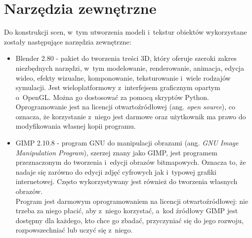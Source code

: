 \documentclass[a4paper,twoside,12pt]{book}
\newcommand{\obcy}[1]{\emph{#1}}
\newcommand{\ang}[1]{{\selectlanguage{british}\obcy{#1}}}
\begin{document}
\section{Narzędzia zewnętrzne}
Do konstrukcji scen, w~tym utworzenia modeli i~tekstur obiektów wykorzystane zostały następujące narzędzia zewnętrzne:
\begin{itemize}
    \item Blender 2.80 - pakiet do tworzenia treści 3D, który oferuje szeroki zakres niezbędnych narzędzi, w~tym modelowanie, renderowanie, animacja, edycja wideo, efekty wizualne, komponowanie, teksturowanie i~wiele rodzajów symulacji. Jest wieloplatformowy z~interfejsem graficznym opartym o~OpenGL. Można go dostosować za pomocą skryptów Python. Oprogramowanie jest na licencji otwartoźródłowej (ang. \ang{open source}), co oznacza, że korzystanie z~niego jest darmowe oraz użytkownik ma prawo do modyfikowania własnej kopii programu. \cite{bib:blender}
    \item GIMP 2.10.8 - program GNU do manipulacji obrazami (ang. \ang{GNU Image Manipulation Program}), szerzej znany jako GIMP, jest programem przeznaczonym do tworzenia i~edycji obrazów bitmapowych. Oznacza to, że nadaje się zarówno do edycji zdjęć cyfrowych jak i~typowej grafiki internetowej. Często wykorzystywany jest również do tworzenia własnych obrazów. \\
    Program jest darmowym oprogramowaniem na licencji otwartoźródłowej: nie trzeba za niego płacić, aby z~niego korzystać, a~kod źródłowy GIMP jest dostępny dla każdego, kto chce go zbadać, przyczyniać się do jego rozwoju, rozpowszechniać lub uczyć się z~niego. \cite{bib:gimp}
\end{itemize}

\vbox{}
\end{document}
